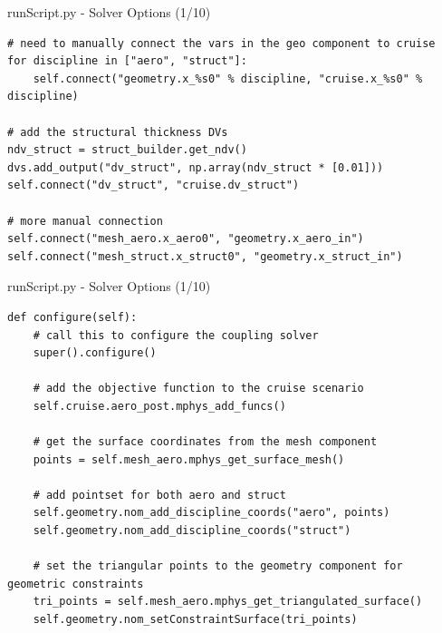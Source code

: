 \documentclass{bredelebeamer}
\begin{document}
\begin{frame}[fragile]{runScript.py - Solver Options (1/10)}
\scriptsize
\lstset{ language=bash }
\begin{lstlisting}
# need to manually connect the vars in the geo component to cruise
for discipline in ["aero", "struct"]:
    self.connect("geometry.x_%s0" % discipline, "cruise.x_%s0" % discipline)

# add the structural thickness DVs
ndv_struct = struct_builder.get_ndv()
dvs.add_output("dv_struct", np.array(ndv_struct * [0.01]))
self.connect("dv_struct", "cruise.dv_struct")

# more manual connection
self.connect("mesh_aero.x_aero0", "geometry.x_aero_in")
self.connect("mesh_struct.x_struct0", "geometry.x_struct_in")
\end{lstlisting}
\normalsize
\end{frame}

\begin{frame}[fragile]{runScript.py - Solver Options (1/10)}
\scriptsize
\lstset{ language=bash }
\begin{lstlisting}
def configure(self):
    # call this to configure the coupling solver
    super().configure()

    # add the objective function to the cruise scenario
    self.cruise.aero_post.mphys_add_funcs()

    # get the surface coordinates from the mesh component
    points = self.mesh_aero.mphys_get_surface_mesh()

    # add pointset for both aero and struct
    self.geometry.nom_add_discipline_coords("aero", points)
    self.geometry.nom_add_discipline_coords("struct")

    # set the triangular points to the geometry component for geometric constraints
    tri_points = self.mesh_aero.mphys_get_triangulated_surface()
    self.geometry.nom_setConstraintSurface(tri_points)
\end{lstlisting}
\normalsize
\end{frame}
\end{document}

